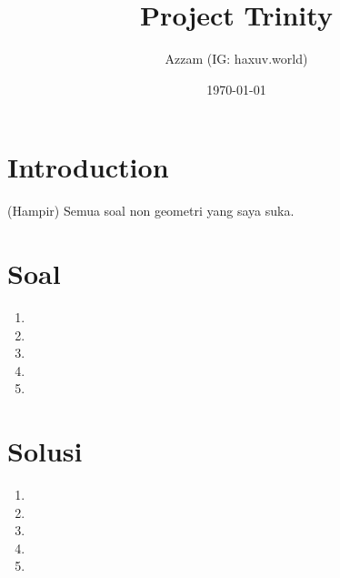 \documentclass[11pt]{scrartcl}
\title{Project Trinity}
\author{Azzam (IG: haxuv.world)}
\date{\today}
\begin{document}
\maketitle

\section{Introduction}
(Hampir) Semua soal non geometri yang saya suka. 

\section{Soal}
\begin{enumerate}
    \item 
    \item 
    \item 
    \item 
    \item 
\end{enumerate}

\section{Solusi}
\begin{enumerate}
    \item 
    \newpage
    \item 
    \newpage
    \item 
    \newpage
    \item 
    \newpage
    \item 
\end{enumerate}
\end{document}
